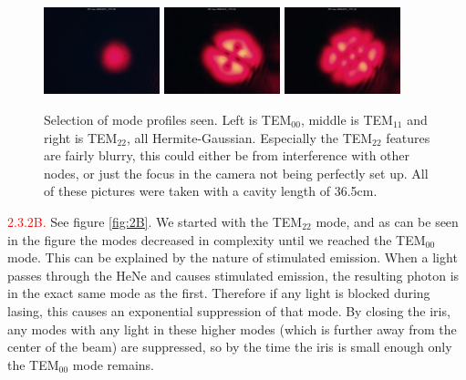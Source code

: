 \documentclass[letterpaper, reqno,11pt]{article}
\begin{document}
\begin{figure}[tb]
    \centering
    \includegraphics[width=0.3\textwidth]{data/2A/im_0228_20240301_175138.jpg}
    \includegraphics[width=0.3\textwidth]{data/2A/im_0224_20240301_175122.jpg}
    \includegraphics[width=0.3\textwidth]{data/2A/im_0223_20240301_175118.jpg}
    \caption{Selection of mode profiles seen. Left is TEM$_{00}$, middle is TEM$_{11}$ and right is TEM$_{22}$, all Hermite-Gaussian. Especially the TEM$_{22}$ features are fairly blurry, this could either be from interference with other nodes, or just the focus in the camera not being perfectly set up. All of these pictures were taken with a cavity length of 36.5cm.}
    \label{fig:2A}
\end{figure}

\noindent \textcolor{red}{2.3.2B.} See figure \ref{fig:2B}. We started with the TEM$_{22}$ mode, and as can be seen in the figure the modes decreased in complexity until we reached the TEM$_{00}$ mode. This can be explained by the nature of stimulated emission. When a light passes through the HeNe and causes stimulated emission, the resulting photon is in the exact same mode as the first. Therefore if any light is blocked during lasing, this causes an exponential suppression of that mode. By closing the iris, any modes with any light in these higher modes (which is further away from the center of the beam) are suppressed, so by the time the iris is small enough only the TEM$_{00}$ mode remains.
\end{document}
